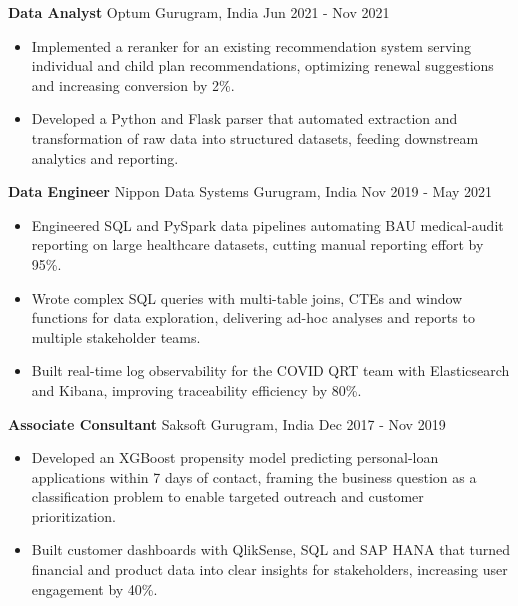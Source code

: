\documentclass[10pt,a4paper]{article}
\newcommand{\role}[4]{\textbf{#1} \textbar{} #2 \hfill #3 \textbar{} #4\par}
\begin{document}
\vspace{3pt}
\role{Data Analyst}{Optum}{Gurugram, India}{Jun 2021 - Nov 2021}
\begin{itemize}
  \item Implemented a reranker for an existing recommendation system serving individual and child plan recommendations, optimizing renewal suggestions and increasing conversion by 2\%.
  \item Developed a Python and Flask parser that automated extraction and transformation of raw data into structured datasets, feeding downstream analytics and reporting.
\end{itemize}
\vspace{3pt}
\role{Data Engineer}{Nippon Data Systems}{Gurugram, India}{Nov 2019 - May 2021}
\begin{itemize}
  \item Engineered SQL and PySpark data pipelines automating BAU medical-audit reporting on large healthcare datasets, cutting manual reporting effort by 95\%.
  \item Wrote complex SQL queries with multi-table joins, CTEs and window functions for data exploration, delivering ad-hoc analyses and reports to multiple stakeholder teams.
  \item Built real-time log observability for the COVID QRT team with Elasticsearch and Kibana, improving traceability efficiency by 80\%.
\end{itemize}
\vspace{3pt}
\role{Associate Consultant}{Saksoft}{Gurugram, India}{Dec 2017 - Nov 2019}
\begin{itemize}
  \item Developed an XGBoost propensity model predicting personal-loan applications within 7 days of contact, framing the business question as a classification problem to enable targeted outreach and customer prioritization.
  \item Built customer dashboards with QlikSense, SQL and SAP HANA that turned financial and product data into clear insights for stakeholders, increasing user engagement by 40\%.
\end{itemize}
\end{document}
